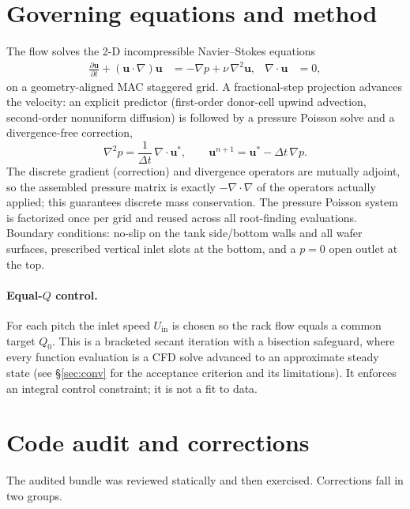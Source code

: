 \documentclass[11pt]{article}
\begin{document}
\section{Governing equations and method}
The flow solves the 2-D incompressible Navier--Stokes equations
\begin{align}
\frac{\partial \mathbf{u}}{\partial t} + (\mathbf{u}\cdot\nabla)\mathbf{u}
&= -\nabla p + \nu\,\nabla^2 \mathbf{u}, &
\nabla\cdot\mathbf{u} &= 0,
\end{align}
on a geometry-aligned MAC staggered grid. A fractional-step projection advances
the velocity: an explicit predictor (first-order donor-cell upwind advection,
second-order nonuniform diffusion) is followed by a pressure Poisson solve and a
divergence-free correction,
\begin{equation}
\nabla^2 p = \frac{1}{\Delta t}\,\nabla\!\cdot\mathbf{u}^{*},
\qquad
\mathbf{u}^{n+1} = \mathbf{u}^{*} - \Delta t\,\nabla p .
\end{equation}
The discrete gradient (correction) and divergence operators are mutually
adjoint, so the assembled pressure matrix is exactly $-\nabla\!\cdot\nabla$ of
the operators actually applied; this guarantees discrete mass conservation. The
pressure Poisson system is factorized once per grid and reused across all
root-finding evaluations. Boundary conditions: no-slip on the tank side/bottom
walls and all wafer surfaces, prescribed vertical inlet slots at the bottom, and
a $p=0$ open outlet at the top.

\paragraph{Equal-$Q$ control.}
For each pitch the inlet speed $U_\mathrm{in}$ is chosen so the rack flow equals
a common target $Q_0$. This is a bracketed secant iteration with a bisection
safeguard, where every function evaluation is a CFD solve advanced to an
approximate steady state (see \S\ref{sec:conv} for the acceptance criterion and
its limitations). It enforces an integral control constraint; it is not a fit to
data.

\section{Code audit and corrections}
The audited bundle was reviewed statically and then exercised. Corrections fall
in two groups.
\end{document}
